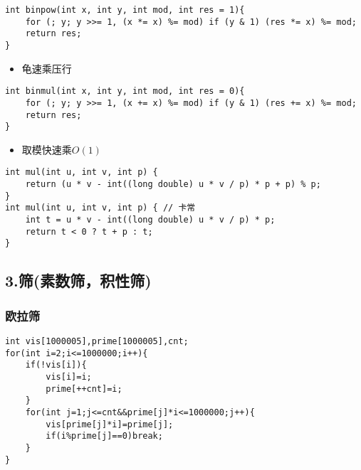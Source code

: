 \documentclass[]{article}
\providecommand{\tightlist}{%
  \setlength{\itemsep}{0pt}\setlength{\parskip}{0pt}}
\begin{document}
\begin{verbatim}
int binpow(int x, int y, int mod, int res = 1){
    for (; y; y >>= 1, (x *= x) %= mod) if (y & 1) (res *= x) %= mod;
    return res;
}
\end{verbatim}

\begin{itemize}
\tightlist
\item
  龟速乘压行
\end{itemize}

\begin{verbatim}
int binmul(int x, int y, int mod, int res = 0){
    for (; y; y >>= 1, (x += x) %= mod) if (y & 1) (res += x) %= mod;
    return res;
}
\end{verbatim}

\begin{itemize}
\tightlist
\item
  取模快速乘\(O(1)\)
\end{itemize}

\begin{verbatim}
int mul(int u, int v, int p) {
    return (u * v - int((long double) u * v / p) * p + p) % p;
}
int mul(int u, int v, int p) { // 卡常
    int t = u * v - int((long double) u * v / p) * p;
    return t < 0 ? t + p : t;
}
\end{verbatim}

\hypertarget{ux7b5bux7d20ux6570ux7b5bux79efux6027ux7b5b}{%
\subsection{3.筛(素数筛，积性筛)}\label{ux7b5bux7d20ux6570ux7b5bux79efux6027ux7b5b}}

\hypertarget{ux6b27ux62c9ux7b5b}{%
\subsubsection{欧拉筛}\label{ux6b27ux62c9ux7b5b}}

\begin{verbatim}
int vis[1000005],prime[1000005],cnt;
for(int i=2;i<=1000000;i++){
    if(!vis[i]){
        vis[i]=i;
        prime[++cnt]=i;
    }
    for(int j=1;j<=cnt&&prime[j]*i<=1000000;j++){
        vis[prime[j]*i]=prime[j];
        if(i%prime[j]==0)break;
    }
}
\end{verbatim}
\end{document}
